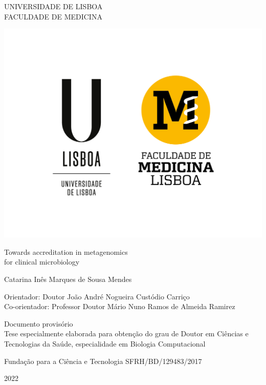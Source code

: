 \begin{titlepage}
    \begin{center}
        UNIVERSIDADE DE LISBOA\\
        FACULDADE DE MEDICINA
        
        {\includegraphics{figures/cover/UL+FMUL-VerticalPositivo.png}}
        
        \vspace{0.5cm}
        
        \Huge
        {Towards accreditation in metagenomics \\[1ex] for clinical microbiology}
        \normalsize
        
        \vspace{0.5cm}
        
        Catarina Inês Marques de Sousa Mendes
        
        \vspace{0.5cm}
        
        Orientador: Doutor João André Nogueira Custódio Carriço\\
        Co-orientador: Professor Doutor Mário Nuno Ramos de Almeida Ramirez
        
        \vspace{0.5cm}
        
        Documento provisório\\
        Tese especialmente elaborada para obtenção do grau de Doutor em Ciências e Tecnologias da Saúde, especialidade em Biologia Computacional\\
        
        \vspace{0.5cm}
        
        Fundação para a Ciência e Tecnologia SFRH/BD/129483/2017
        
        \vspace{0.5cm}
        
        2022
        
    \end{center}
\end{titlepage}